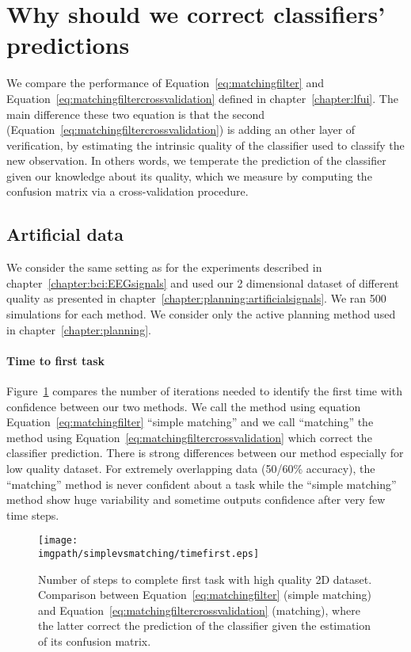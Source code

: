 
\section{Why should we correct classifiers' predictions}
\label{chapter:limitiations:simplevsmatching}

We compare the performance of Equation~\ref{eq:matchingfilter} and Equation~\ref{eq:matchingfiltercrossvalidation} defined in chapter~\ref{chapter:lfui}. The main difference these two equation is that the second (Equation~\ref{eq:matchingfiltercrossvalidation}) is adding an other layer of verification, by estimating the intrinsic quality of the classifier used to classify the new observation. In others words, we temperate the prediction of the classifier given our knowledge about its quality, which we measure by computing the confusion matrix via a cross-validation procedure.

\subsection{Artificial data}

We consider the same setting as for the experiments described in chapter~\ref{chapter:bci:EEGsignals} and used our 2 dimensional dataset of different quality as presented in chapter~\ref{chapter:planning:artificialsignals}. We ran 500 simulations for each method. We consider only the active planning method used in chapter~\ref{chapter:planning}.

\paragraph{Time to first task} Figure~\ref{fig:timefirst_simplevsmatching} compares the number of iterations needed to identify the first time with confidence between our two methods. We call the method using equation Equation~\ref{eq:matchingfilter} ``simple matching'' and we call ``matching'' the method using Equation~\ref{eq:matchingfiltercrossvalidation} which correct the classifier prediction. There is strong differences between our method especially for low quality dataset. For extremely overlapping data (50/60\% accuracy), the ``matching'' method is never confident about a task while the ``simple matching'' method show huge variability and sometime outputs confidence after very few time steps. 

\begin{figure}[!ht]
\centering
\texttt{[image: \\imgpath/simplevsmatching/timefirst.eps]}
\caption{Number of steps to complete first task with high quality 2D dataset. Comparison between Equation~\ref{eq:matchingfilter} (simple matching) and Equation~\ref{eq:matchingfiltercrossvalidation} (matching), where the latter correct the prediction of the classifier given the estimation of its confusion matrix.}
\label{fig:timefirst_simplevsmatching}
\end{figure} 

